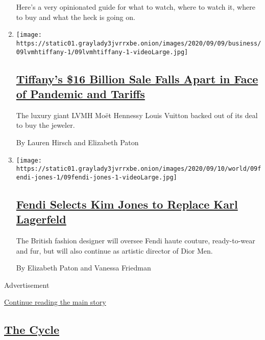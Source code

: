 \begin{enumerate}
  Here's a very opinionated guide for what to watch, where to watch it,
  where to buy and what the heck is going on.
\item
  \texttt{[image: https://static01.graylady3jvrrxbe.onion/images/2020/09/09/business/09lvmhtiffany-1/09lvmhtiffany-1-videoLarge.jpg]}

  \hypertarget{tiffanys-16-billion-sale-falls-apart-in-face-of-pandemic-and-tariffs}{%
  \subsection{\texorpdfstring{\href{/2020/09/09/business/lvmh-tiffany-deal-lawsuit.html}{Tiffany's
  \$16 Billion Sale Falls Apart in Face of Pandemic and
  Tariffs}}{Tiffany's \$16 Billion Sale Falls Apart in Face of Pandemic and Tariffs}}\label{tiffanys-16-billion-sale-falls-apart-in-face-of-pandemic-and-tariffs}}

  The luxury giant LVMH Moët Hennessy Louis Vuitton backed out of its
  deal to buy the jeweler.

  By Lauren Hirsch and Elizabeth Paton
\item
  \texttt{[image: https://static01.graylady3jvrrxbe.onion/images/2020/09/10/world/09fendi-jones-1/09fendi-jones-1-videoLarge.jpg]}

  \hypertarget{fendi-selects-kim-jones-to-replace-karl-lagerfeld-1}{%
  \subsection{\texorpdfstring{\href{/2020/09/09/style/fendi-kim-jones-lagerfeld.html}{Fendi
  Selects Kim Jones to Replace Karl
  Lagerfeld}}{Fendi Selects Kim Jones to Replace Karl Lagerfeld}}\label{fendi-selects-kim-jones-to-replace-karl-lagerfeld-1}}

  The British fashion designer will oversee Fendi haute couture,
  ready-to-wear and fur, but will also continue as artistic director of
  Dior Men.

  By Elizabeth Paton and Vanessa Friedman
\end{enumerate}

Advertisement

\protect\hyperlink{after-mid5}{Continue reading the main story}

\hypertarget{the-cycle}{%
\subsection{\texorpdfstring{\href{/column/the-cycle}{The
Cycle}}{The Cycle}}\label{the-cycle}}

